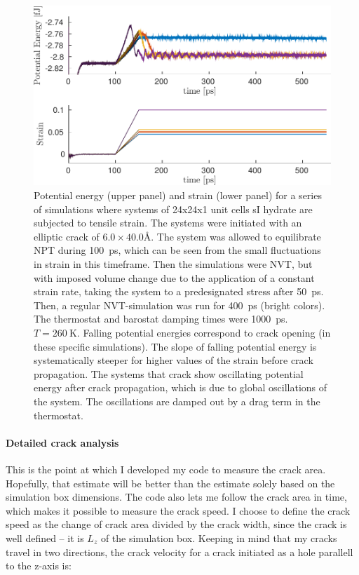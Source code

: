 \begin{figure}
\includegraphics[width=\textwidth]{../figures/thesis/proof_of_concept_poteng_strain.pdf}
\caption{Potential energy (upper panel) and strain (lower panel) for a series of simulations where systems of 24x24x1 unit cells sI hydrate are subjected to tensile strain. The systems were initiated with an elliptic crack of $6.0 \times 40.0 \si{\angstrom}$. The system was allowed to equilibrate NPT during \SI{100}{\pico\second}, which can be seen from the small fluctuations in strain in this timeframe. Then the simulations were NVT, but with imposed volume change due to the application of a constant strain rate, taking the system to a predesignated stress after \SI{50}{\pico\second}. Then, a regular NVT-simulation was run for \SI{400}{\pico\second} (bright colors). The thermostat and barostat damping times were \SI{1000}{\pico\second}. $T=\SI{260}{\kelvin}$. Falling potential energies correspond to crack opening (in these specific simulations). The slope of falling potential energy is systematically steeper for higher values of the strain before crack propagation. The systems that crack show oscillating potential energy after crack propagation, which is due to global oscillations of the system. The oscillations are damped out by a drag term in the thermostat. }
\label{fig:proof_of_concept_crack}
\end{figure}

\paragraph{Detailed crack analysis}
This is the point at which I developed my code to measure the crack area. Hopefully, that estimate will be better than the estimate solely based on the simulation box dimensions. The code also lets me follow the crack area in time, which makes it possible to measure the crack speed. I choose to define the crack speed as the change of crack area divided by the crack width, since the crack is well defined – it is $L_z$ of the simulation box. Keeping in mind that my cracks travel in two directions, the crack velocity for a crack initiated as a hole parallell to the z-axis is:

